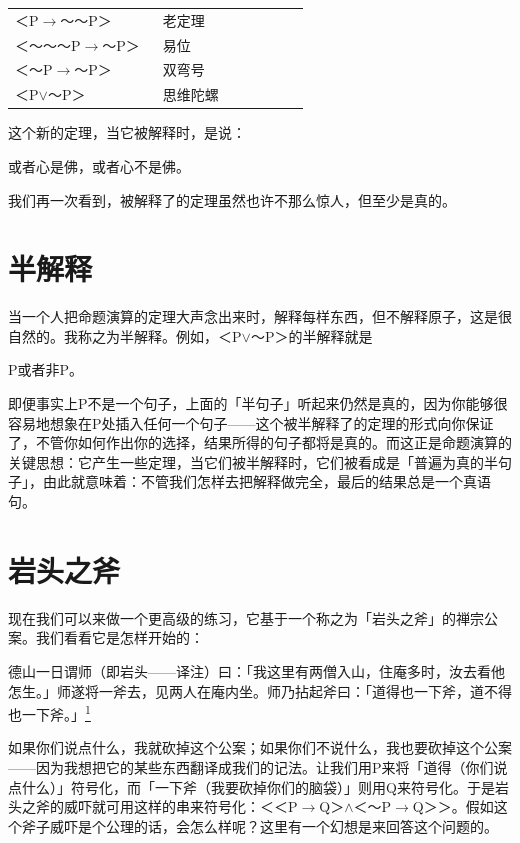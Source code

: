 \documentclass[
  12pt,
  twoside,
  openright,
  oldfontcommands,
]{memoir}
\begin{document}
\begin{longtable}[]{>{\raggedright\arraybackslash}p{0.47\linewidth} >{\raggedright\arraybackslash}p{0.47\linewidth}}
\toprule\noalign{}
\endhead
\bottomrule\noalign{}
\endlastfoot
＜P$\rightarrow$～～P＞ & 老定理 \\
＜～～～P$\rightarrow$～P＞ & 易位 \\
＜～P$\rightarrow$～P＞ & 双弯号 \\
＜P$\vee$～P＞ & 思维陀螺 \\
\end{longtable}

这个新的定理，当它被解释时，是说：

或者心是佛，或者心不是佛。

我们再一次看到，被解释了的定理虽然也许不那么惊人，但至少是真的。

\section{半解释}

当一个人把命题演算的定理大声念出来时，解释每样东西，但不解释原子，这是很自然的。我称之为半解释。例如，＜P$\vee$～P＞的半解释就是

P或者非P。

即便事实上P不是一个句子，上面的「半句子」听起来仍然是真的，因为你能够很容易地想象在P处插入任何一个句子------这个被半解释了的定理的形式向你保证了，不管你如何作出你的选择，结果所得的句子都将是真的。而这正是命题演算的关键思想：它产生一些定理，当它们被半解释时，它们被看成是「普遍为真的半句子」，由此就意味着：不管我们怎样去把解释做完全，最后的结果总是一个真语句。

\section{岩头之斧}

现在我们可以来做一个更高级的练习，它基于一个称之为「岩头之斧」的禅宗公案。我们看看它是怎样开始的：

德山一日谓师（即岩头------译注）曰：「我这里有两僧入山，住庵多时，汝去看他怎生。」师遂将一斧去，见两人在庵内坐。师乃拈起斧曰：「道得也一下斧，道不得也一下斧。」\hyperref[fn:Chapter07-1]{\textsuperscript{1}}

如果你们说点什么，我就砍掉这个公案；如果你们不说什么，我也要砍掉这个公案------因为我想把它的某些东西翻译成我们的记法。让我们用P来将「道得（你们说点什么）」符号化，而「一下斧（我要砍掉你们的脑袋）」则用Q来符号化。于是岩头之斧的威吓就可用这样的串来符号化：＜＜P$\rightarrow$Q＞$\wedge$＜～P$\rightarrow$Q＞＞。假如这个斧子威吓是个公理的话，会怎么样呢？这里有一个幻想是来回答这个问题的。
\end{document}
